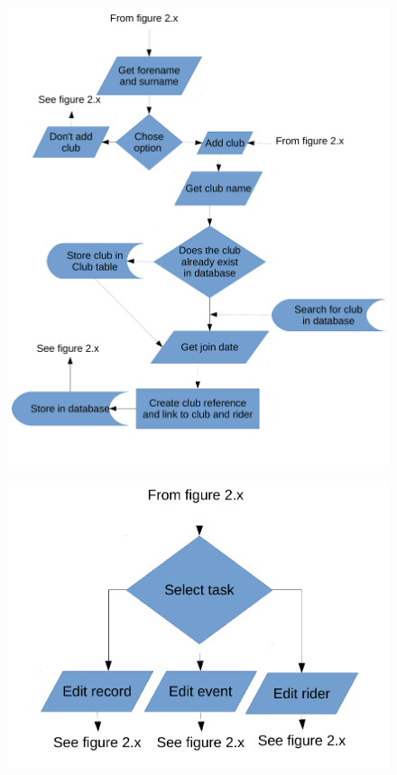 \begin{figure}[H]
	\includegraphics[width=\textwidth]{./FlowChart/SectionThree.pdf}
	\caption{} \label{fig:} 	
\end{figure}

\begin{figure}[H]
	\includegraphics[width=\textwidth]{./FlowChart/SectionFour.pdf}
	\caption{} \label{fig:} 	
\end{figure}

